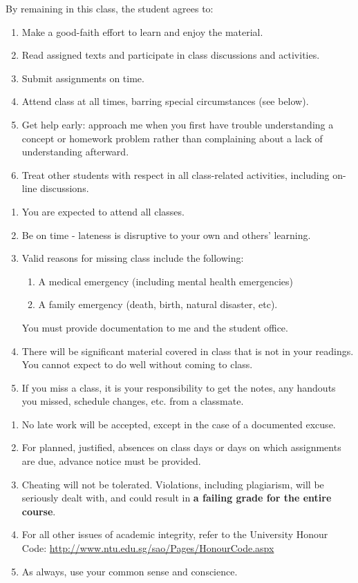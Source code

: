 \documentclass[a4paper,landscape,headrule,footrule]{foils}
\begin{document}
By remaining in this class, the student agrees to:
\begin{enumerate}
\item  Make a good-faith effort to learn and enjoy the material.
\item  Read assigned texts and participate in class discussions and activities.
\item Submit assignments on time.
\item Attend class at all times, barring special circumstances (see below).
\item Get help early: approach me when you first have trouble understanding a concept or homework problem rather than complaining about a lack of understanding afterward.
\item Treat other students with respect in all class-related activities, including on-line discussions.
\end{enumerate}
\begin{enumerate}
\item You are expected to attend all classes.
\item Be on time - lateness is disruptive to your own and others' learning.
\item Valid reasons for missing class include the following:
\begin{enumerate}
\item A medical emergency (including mental health emergencies)
\item A family emergency (death, birth, natural disaster, etc).
\end{enumerate}
You must provide documentation to me and the student office.
\item There will be significant material covered in class that is not in your readings.  You cannot expect to do well without coming to class.
\item If you miss a class, it is your responsibility to get the notes, any handouts you missed, schedule changes, etc. from a classmate.
\end{enumerate}

\begin{enumerate}
\item No late work will be accepted, except in the case of a documented excuse.
\item For planned, justified, absences on class days or days on which assignments are due, advance notice must be provided.
\item Cheating will not be tolerated. Violations, including plagiarism, will be seriously dealt with, and could result in \textbf{a failing grade for the entire course}.
\item For all other issues of academic integrity, refer to the University Honour Code: \url{http://www.ntu.edu.sg/sao/Pages/HonourCode.aspx}
\item As always, use your common sense and conscience.
\end{enumerate}
\end{document}
